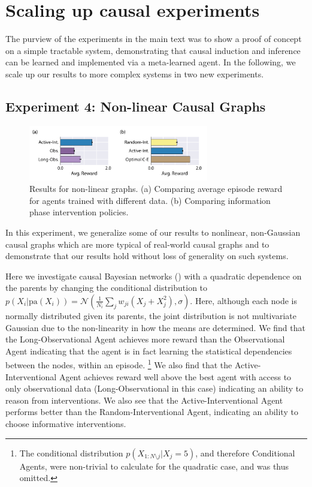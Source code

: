 \section{Scaling up causal experiments}
\label{app:causal_addexpt}

The purview of the experiments in the main text was to show a proof of concept on a simple tractable system, demonstrating that causal induction and inference can be learned and implemented via a meta-learned agent. In the following, we scale up our results to more complex systems in two new experiments.

\subsection{Experiment 4: Non-linear Causal Graphs}

\begin{figure}[ht!]
\centering
\includegraphics[width=0.7\textwidth]{figures/Nonlinear_results.pdf} 
\caption{Results for non-linear graphs. (a) Comparing average episode reward for agents trained with different data. (b) Comparing information phase intervention policies. }
\label{fig:nonlinear_results}
\end{figure}

In this experiment, we generalize some of our results to nonlinear, non-Gaussian causal graphs which are more typical of real-world causal graphs and to demonstrate that our results hold without loss of generality on such systems. 

Here we investigate causal Bayesian networks (\CBNs) with a quadratic dependence on the parents by changing the conditional distribution to $p(X_{i}|\textrm{pa}(X_{i})) = \mathcal{N}(\frac{1}{N_{i}} \sum_{j} w_{ji}(X_{j} + X_{j}^2), \sigma)$. Here, although each node is normally distributed given its parents, the joint distribution is not multivariate Gaussian due to the non-linearity in how the means are determined. We find that the Long-Observational Agent achieves more reward than the Observational Agent indicating that the agent is in fact learning the statistical dependencies between the nodes, within an episode.
\footnote{The conditional distribution $p(X_{1:N\setminus j }|X_j=5)$, and therefore Conditional Agents, were non-trivial to calculate for the quadratic case, and was thus omitted.}
We also find that the Active-Interventional Agent achieves reward well above the best agent with access to only observational data (Long-Observational in this case) indicating an ability to reason from interventions. We also see that the Active-Interventional Agent performs better than the Random-Interventional Agent, indicating an ability to choose informative interventions.


